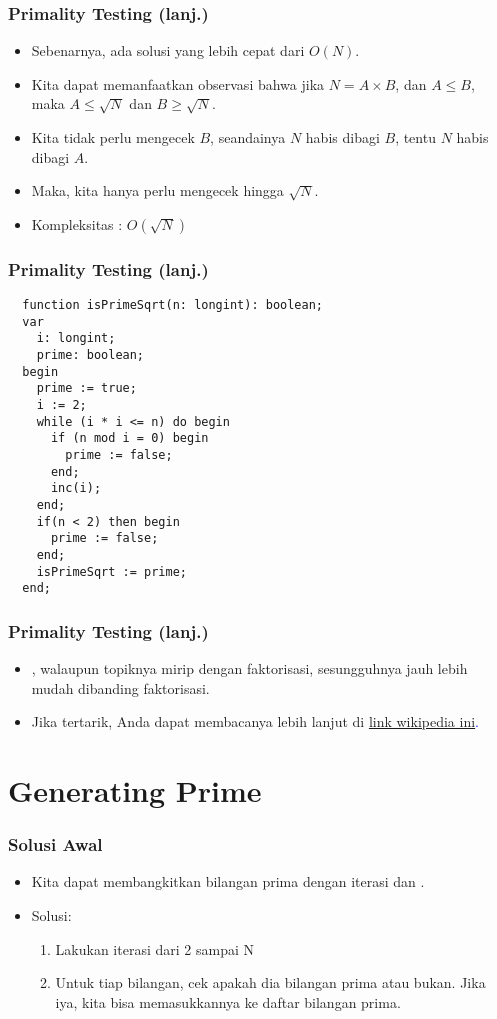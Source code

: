 \begin{frame}
\frametitle{Primality Testing (lanj.)}
\begin{itemize}
  \item Sebenarnya, ada solusi yang lebih cepat dari $O(N)$.
  \item Kita dapat memanfaatkan observasi bahwa jika $N = A \times B$, dan $A \leq B$, maka $A \leq \sqrt{N}$ dan $B \geq \sqrt{N}$.
  \item Kita tidak perlu mengecek $B$, seandainya $N$ habis dibagi $B$, tentu $N$ habis dibagi $A$.
  \item Maka, kita hanya perlu mengecek hingga $\sqrt{N}$.
  \item Kompleksitas : $O(\sqrt{N})$
\end{itemize}
\end{frame}

\begin{frame}[fragile]
\frametitle{Primality Testing (lanj.)}
\begin{lstlisting}
  function isPrimeSqrt(n: longint): boolean;
  var
    i: longint;
    prime: boolean;
  begin
    prime := true;
    i := 2;
    while (i * i <= n) do begin
      if (n mod i = 0) begin
        prime := false;
      end;
      inc(i);
    end;
    if(n < 2) then begin
      prime := false;
    end;
    isPrimeSqrt := prime;
  end;  
\end{lstlisting}
\end{frame}

\begin{frame}
\frametitle{Primality Testing (lanj.)}
\begin{itemize}
  \item {}, walaupun topiknya mirip dengan faktorisasi, sesungguhnya jauh lebih mudah dibanding faktorisasi.
  \item Jika tertarik, Anda dapat membacanya lebih lanjut di \textcolor{blue}{\href{https://en.wikipedia.org/wiki/Primality_test}{link wikipedia ini}.} 
\end{itemize}
\end{frame}

\section{Generating Prime}
\frame{\sectionpage}

\begin{frame}
\frametitle{Solusi Awal}
\begin{itemize}
  \item Kita dapat membangkitkan bilangan prima dengan iterasi dan .
  \item Solusi: 
  \begin{enumerate}
    \item Lakukan iterasi dari 2 sampai N
    \item Untuk tiap bilangan, cek apakah dia bilangan prima atau bukan. Jika iya, kita bisa memasukkannya ke daftar bilangan prima.
  \end{enumerate}
\end{itemize}
\end{frame}

